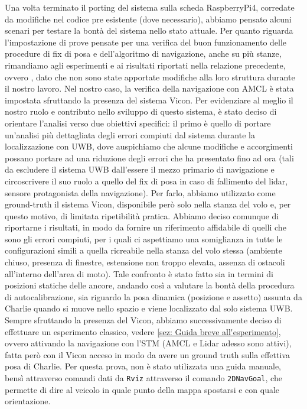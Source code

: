 Una volta terminato il porting del sistema sulla scheda RaspberryPi4, corredate da modifiche nel codice pre esistente (dove necessario),
abbiamo pensato alcuni scenari per testare la bontà del sistema nello stato attuale. Per quanto riguarda l'impostazione di prove pensate
per una verifica del buon funzionamento delle procedure di fix di posa e dell'algoritmo di navigazione, anche su più stanze, rimandiamo agli 
esperimenti e ai risultati riportati nella relazione precedente, ovvero \cite{ptvlocalizzazione}, dato che non sono state apportate modifiche
alla loro struttura durante il nostro lavoro. 
Nel nostro caso, la verifica della navigazione con AMCL è stata impostata sfruttando la presenza del sistema Vicon.
Per evidenziare al meglio il nostro ruolo e contributo nello sviluppo di questo sistema, è stato deciso di orientare l'analisi verso due obiettivi
specifici: il primo è quello di portare un'analisi più dettagliata degli errori compiuti dal sistema durante la localizzazione con UWB, dove 
auspichiamo che alcune modifiche e accorgimenti possano portare ad una riduzione degli errori che ha presentato fino ad ora (tali da escludere il 
sistema UWB dall'essere il mezzo primario di navigazione e circoscrivere il suo ruolo a quello del fix di posa in caso di fallimento del lidar, 
sensore protagonista della navigazione). 
Per farlo, abbiamo utilizzato come ground-truth il sistema Vicon, disponibile però solo nella stanza del volo e, per questo motivo, di limitata 
ripetibilità pratica. Abbiamo deciso comunque di riportarne i risultati, in modo da fornire un riferimento affidabile di quelli che sono gli errori
compiuti, per i quali ci aspettiamo una somiglianza in tutte le configurazioni simili a quella ricreabile nella stanza del volo stessa (ambiente
chiuso, presenza di finestre, estensione non troppo elevata, assenza di ostacoli all'interno dell'area di moto). Tale confronto è stato fatto 
sia in termini di posizioni statiche delle ancore, andando così a valutare la bontà della procedura di autocalibrazione, sia riguardo la posa 
dinamica (posizione e assetto) assunta da Charlie quando si muove nello spazio e viene localizzato dal solo sistema UWB.
Sempre sfruttando la presenza del Vicon, abbiamo successivamente deciso di effettuare un esperimento classico, vedere \ref{sez: Guida breve all'esperimento}, 
ovvero attivando la navigazione con l'STM (AMCL e Lidar adesso sono attivi), fatta però con il Vicon acceso in modo da avere un ground truth sulla effettiva
posa di Charlie. Per questa prova, non è stato utilizzata una guida manuale, bensì attraverso comandi dati da \verb|Rviz| attraverso il comando \verb|2DNavGoal|, 
che permette di dire al veicolo in quale punto della mappa spostarsi e con quale orientazione.

